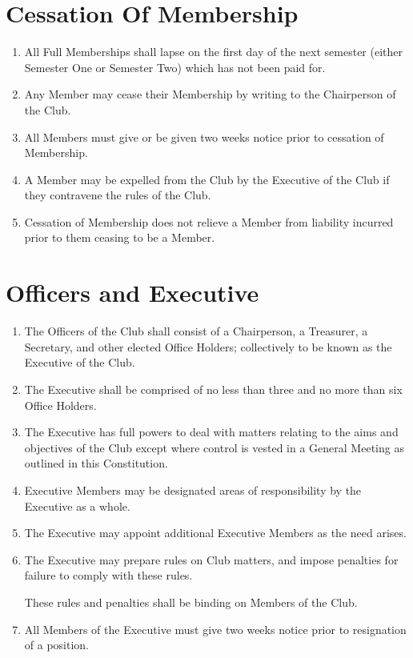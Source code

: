 \documentclass[a4paper]{article}
\begin{document}
	\section{Cessation Of Membership}
	
	\begin{enumerate}
		\item All Full Memberships shall lapse on the first day of the next semester (either Semester One or Semester Two) which has not been paid for.
		
		\item \label{cease-by-writing} Any Member may cease their Membership by writing to the Chairperson of the Club.
		
		\item All Members must give or be given two weeks notice prior to cessation of Membership.
		
		\item \label{cease-by-expulsion} A Member may be expelled from the Club by the Executive of the Club if they contravene the rules of the Club.
		
		\item Cessation of Membership does not relieve a Member from liability incurred prior to them ceasing to be a Member.
	\end{enumerate}

	\section{Officers and Executive}
	
	\begin{enumerate}
		\item The Officers of the Club shall consist of a Chairperson, a Treasurer,  a Secretary, and other elected Office Holders; collectively to be known as the Executive of the Club.
		
		\item The Executive shall be comprised of no less than three and no more than six Office Holders.
		
		\item The Executive has full powers to deal with matters relating to the aims and objectives of the Club except where control is vested in a General Meeting as outlined in this Constitution.
		
		\item Executive Members may be designated areas of responsibility by the Executive as a whole.
		
		\item The Executive may appoint additional Executive Members as the need arises.
		
		\item The Executive may prepare rules on Club matters, and impose penalties for failure to comply with these rules.
		
		These rules and penalties shall be binding on Members of the Club.
		\item All Members of the Executive must give two weeks notice prior to resignation of a position.
	\end{enumerate}
	
\end{document}
